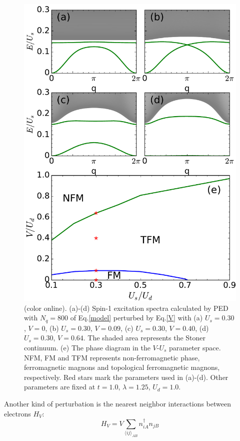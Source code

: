 \documentclass[amsmath,superscriptaddress,showpacs,aps,prb,twocolumn]{revtex4-1}
\begin{document}
\begin{figure}
\includegraphics[scale=0.46]{v_spectrum}
\caption{(color online). (a)-(d) Spin-1 excitation spectra calculated by PED with $N_q=800$ of Eq.\ref{model} perturbed by Eq.\ref{V} with (a) $U_s=0.30$, $V=0$, (b) $U_s=0.30$, $V=0.09$, (c) $U_s=0.30$, $V=0.40$, (d) $U_s=0.30$, $V=0.64$. The shaded area represents the Stoner continuum. (e) The phase diagram in the $V$-$U_s$ parameter space. NFM, FM and TFM represents non-ferromagnetic phase, ferromagnetic magnons and topological ferromagnetic magnons, respectively. Red stars mark the parameters used in (a)-(d). Other parameters are fixed at $t=1.0$, $\lambda=1.25$, $U_d=1.0$.}
\label{vspectrum}
\end{figure}

\par Another kind of perturbation is the nearest neighbor interactions between electrons $H_V$:
\begin{equation}\label{V}
H_{V}=V\sum_{\langle ij\rangle_{AB}}n_{iA}^\dagger n_{jB}
\end{equation}
\end{document}
